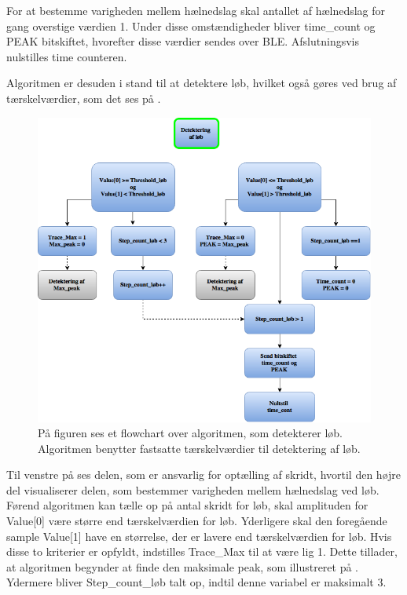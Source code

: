 For at bestemme varigheden mellem hælnedslag skal antallet af hælnedslag for gang overstige værdien 1. Under disse omstændigheder bliver time\_count og PEAK bitskiftet, hvorefter disse værdier sendes over BLE. Afslutningsvis nulstilles time counteren.

Algoritmen er desuden i stand til at detektere løb, hvilket også gøres ved brug af tærskelværdier, som det ses på .
\begin{figure}[H]
	\centering
	\includegraphics[scale=0.6]{figures/cDesign/loeb_ckode_pseudo.png}
	\caption{På figuren ses et flowchart over algoritmen, som detekterer løb. Algoritmen benytter fastsatte tærskelværdier til detektering af løb.}
	\label{fig:loeb_pseudo}
\end{figure}\vspace{-0.25cm}
Til venstre på  ses delen, som er ansvarlig for optælling af skridt, hvortil den højre del visualiserer delen, som bestemmer varigheden mellem hælnedslag ved løb. Førend algoritmen kan tælle op på antal skridt for løb, skal amplituden for Value[0] være større end tærskelværdien for løb. Yderligere skal den foregående sample Value[1] have en størrelse, der er lavere end tærskelværdien for løb. Hvis disse to kriterier er opfyldt, indstilles Trace\_Max til at være lig 1. Dette tillader, at algoritmen begynder at finde den maksimale peak, som illustreret på . Ydermere bliver Step\_count\_løb talt op, indtil denne variabel er maksimalt 3. \\

